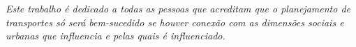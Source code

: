 \documentclass[
  12pt,        %
  openright,      %
  twoside,      %
  a4paper,      %
  english,      %
  brazil        %
]{abntex2}
\begin{document}
%
% 
%
%
%
%
%
%
%
%

\begin{dedicatoria}
   \vspace*{\fill}
   \centering
   \noindent
   \textit{Este trabalho é dedicado a todas as pessoas que acreditam que o planejamento de transportes só será bem-sucedido se houver conexão com as dimensões sociais e urbanas que influencia e pelas quais é influenciado.} \vspace*{\fill}
\end{dedicatoria}
\end{document}
